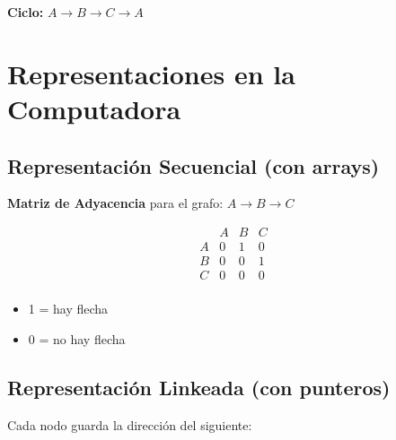 \documentclass[12pt,a4paper]{article}
\begin{document}
\begin{center}
\end{center}

\textbf{Ciclo:} $A \rightarrow B \rightarrow C \rightarrow A$

\section{Representaciones en la Computadora}

\subsection{Representación Secuencial (con arrays)}

\textbf{Matriz de Adyacencia} para el grafo: $A \rightarrow B \rightarrow C$

$$
\begin{array}{c|ccc}
  & A & B & C \\
\hline
A & 0 & 1 & 0 \\
B & 0 & 0 & 1 \\
C & 0 & 0 & 0 \\
\end{array}
$$

\begin{itemize}
    \item 1 = hay flecha
    \item 0 = no hay flecha
\end{itemize}

\subsection{Representación Linkeada (con punteros)}

Cada nodo guarda la dirección del siguiente:
\end{document}
